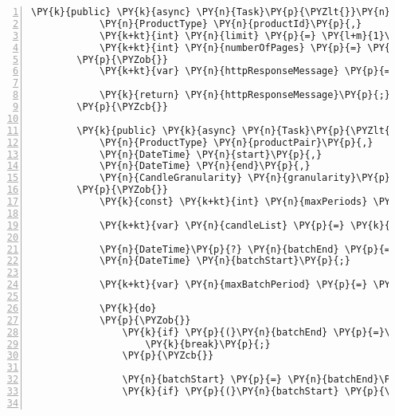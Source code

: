\begin{Verbatim}[commandchars=\\\{\},numbers=left,firstnumber=1,stepnumber=1,numberblanklines=0]
        \PY{k}{public} \PY{k}{async} \PY{n}{Task}\PY{p}{\PYZlt{}}\PY{n}{IList}\PY{p}{\PYZlt{}}\PY{n}{IList}\PY{p}{\PYZlt{}}\PY{n}{ProductTrade}\PY{p}{\PYZgt{}}\PY{p}{\PYZgt{}}\PY{p}{\PYZgt{}} \PY{n}{GetTradesAsync}\PY{p}{(}
            \PY{n}{ProductType} \PY{n}{productId}\PY{p}{,}
            \PY{k+kt}{int} \PY{n}{limit} \PY{p}{=} \PY{l+m}{1}\PY{l+m}{0}\PY{l+m}{0}\PY{p}{,}
            \PY{k+kt}{int} \PY{n}{numberOfPages} \PY{p}{=} \PY{l+m}{0}\PY{p}{)}
        \PY{p}{\PYZob{}}
            \PY{k+kt}{var} \PY{n}{httpResponseMessage} \PY{p}{=} \PY{k}{await} \PY{n}{SendHttpRequestMessagePagedAsync}\PY{p}{\PYZlt{}}\PY{n}{ProductTrade}\PY{p}{\PYZgt{}}\PY{p}{(}\PY{n}{HttpMethod}\PY{p}{.}\PY{n}{Get}\PY{p}{,} \PY{err}{\PYZdl{}}\PY{l+s}{\PYZdq{}/products/\PYZob{}productId.GetEnumMemberValue()\PYZcb{}/trades?limit=\PYZob{}limit\PYZcb{}\PYZdq{}}\PY{p}{,} \PY{n}{numberOfPages}\PY{p}{:} \PY{n}{numberOfPages}\PY{p}{)}\PY{p}{;}

            \PY{k}{return} \PY{n}{httpResponseMessage}\PY{p}{;}
        \PY{p}{\PYZcb{}}

        \PY{k}{public} \PY{k}{async} \PY{n}{Task}\PY{p}{\PYZlt{}}\PY{n}{IList}\PY{p}{\PYZlt{}}\PY{n}{Candle}\PY{p}{\PYZgt{}}\PY{p}{\PYZgt{}} \PY{n}{GetHistoricRatesAsync}\PY{p}{(}
			\PY{n}{ProductType} \PY{n}{productPair}\PY{p}{,}
			\PY{n}{DateTime} \PY{n}{start}\PY{p}{,}
			\PY{n}{DateTime} \PY{n}{end}\PY{p}{,}
			\PY{n}{CandleGranularity} \PY{n}{granularity}\PY{p}{)}
        \PY{p}{\PYZob{}}
            \PY{k}{const} \PY{k+kt}{int} \PY{n}{maxPeriods} \PY{p}{=} \PY{l+m}{3}\PY{l+m}{0}\PY{l+m}{0}\PY{p}{;}

            \PY{k+kt}{var} \PY{n}{candleList} \PY{p}{=} \PY{k}{new} \PY{n}{List}\PY{p}{\PYZlt{}}\PY{n}{Candle}\PY{p}{\PYZgt{}}\PY{p}{(}\PY{p}{)}\PY{p}{;}

            \PY{n}{DateTime}\PY{p}{?} \PY{n}{batchEnd} \PY{p}{=} \PY{n}{end}\PY{p}{;}
            \PY{n}{DateTime} \PY{n}{batchStart}\PY{p}{;}

            \PY{k+kt}{var} \PY{n}{maxBatchPeriod} \PY{p}{=} \PY{p}{(}\PY{k+kt}{int}\PY{p}{)}\PY{n}{granularity} \PY{p}{*} \PY{n}{maxPeriods}\PY{p}{;}

            \PY{k}{do}
            \PY{p}{\PYZob{}}
                \PY{k}{if} \PY{p}{(}\PY{n}{batchEnd} \PY{p}{=}\PY{p}{=} \PY{k}{null}\PY{p}{)} \PY{p}{\PYZob{}}
                    \PY{k}{break}\PY{p}{;}
                \PY{p}{\PYZcb{}}

                \PY{n}{batchStart} \PY{p}{=} \PY{n}{batchEnd}\PY{p}{.}\PY{n}{Value}\PY{p}{.}\PY{n}{AddSeconds}\PY{p}{(}\PY{p}{\PYZhy{}}\PY{n}{maxBatchPeriod}\PY{p}{)}\PY{p}{;}
                \PY{k}{if} \PY{p}{(}\PY{n}{batchStart} \PY{p}{\PYZlt{}} \PY{n}{start}\PY{p}{)} \PY{n}{batchStart} \PY{p}{=} \PY{n}{start}\PY{p}{;}


\end{Verbatim}
